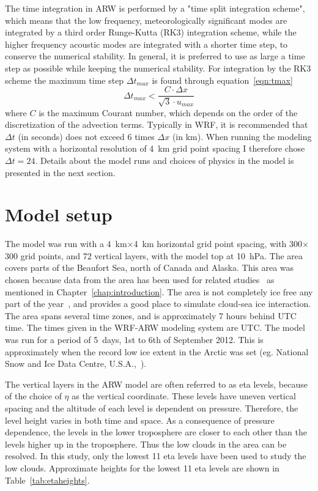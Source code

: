 The time integration in ARW is performed by a "time split integration scheme", which means that the low frequency, meteorologically significant modes are integrated by a third order Runge-Kutta (RK3) integration scheme, while the higher frequency acoustic modes are integrated with a shorter time step, to conserve the numerical stability. In general, it is preferred to use as large a time step as possible while keeping the numerical stability. For integration by the RK3 scheme the maximum time step $\Delta t_{max}$ is found through equation~\ref{eqn:tmax}
\begin{equation}
\Delta t_{max} < \frac{C\cdot \Delta x}{\sqrt{3}\cdot u_{max}}
\label{eqn:tmax}
\end{equation}
where $C$ is the maximum Courant number, which depends on the order of the discretization of the advection terms. Typically in WRF, it is recommended that $\Delta t$ (in seconds) does not exceed 6 times $\Delta x$ (in km). When running the modeling system with a horizontal resolution of 4~km grid point spacing I therefore chose $\Delta t = 24$. Details about the model runs and choices of physics in the model is presented in the next section.

\section{Model setup}
\label{sec:modelsetup}
The model was run with a 4~km$\times$4~km horizontal grid point spacing, with 300$\times$300 grid points, and 72 vertical layers, with the model top at 10~hPa.
The area covers parts of the Beaufort Sea, north of Canada and Alaska. This area was chosen because data from the area has been used for related studies~\citep{Shupe2004,Kay2009,Wu2012,Palm2010,Schweiger2008,Eastman2010a} as mentioned in Chapter~\ref{chap:introduction}. The area is not completely ice free any part of the year~\citep{NSIDC}, and provides a good place to simulate cloud-sea ice interaction. The area spans several time zones, and is approximately 7 hours behind UTC time. The times given in the WRF-ARW modeling system are UTC. The model was run for a period of 5~days, 1st to 6th of September 2012. This is approximately when the record low ice extent in the Arctic was set (eg. National Snow and Ice Data Centre, U.S.A.,~\citep{NSIDC}).

The vertical layers in the ARW model are often referred to as eta levels, because of the choice of $\eta$ as the vertical coordinate. These levels have uneven vertical spacing and the altitude of each level is dependent on pressure. Therefore, the level height varies in both time and space. As a consequence of pressure dependence, the levels in the lower troposphere are closer to each other than the levels higher up in the troposphere. Thus the low clouds in the area can be resolved. In this study, only the lowest 11 eta levels have been used to study the low clouds. Approximate heights for the lowest 11 eta levels are shown in Table~\ref{tab:etaheights}.

